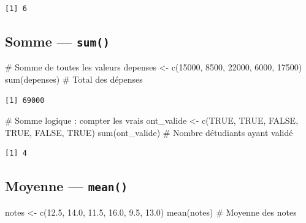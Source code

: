 \documentclass[
  french,
  11pt,
  a4paper,
]{article}
\newenvironment{Shaded}{}{}
\newcommand{\CommentTok}[1]{\textcolor[rgb]{0.42,0.45,0.49}{#1}}
\newcommand{\ConstantTok}[1]{\textcolor[rgb]{0.00,0.36,0.77}{#1}}
\newcommand{\DecValTok}[1]{\textcolor[rgb]{0.00,0.36,0.77}{#1}}
\newcommand{\FloatTok}[1]{\textcolor[rgb]{0.00,0.36,0.77}{#1}}
\newcommand{\FunctionTok}[1]{\textcolor[rgb]{0.44,0.26,0.76}{#1}}
\newcommand{\NormalTok}[1]{\textcolor[rgb]{0.14,0.16,0.18}{#1}}
\newcommand{\OtherTok}[1]{\textcolor[rgb]{0.44,0.26,0.76}{#1}}
\begin{document}
\begin{verbatim}
[1] 6
\end{verbatim}

\subsection{\texorpdfstring{Somme ---
\texttt{sum()}}{Somme --- sum()}}\label{somme-sum}

\begin{Shaded}
\begin{Highlighting}[]
\CommentTok{\# Somme de toutes les valeurs}
\NormalTok{depenses }\OtherTok{\textless{}{-}} \FunctionTok{c}\NormalTok{(}\DecValTok{15000}\NormalTok{, }\DecValTok{8500}\NormalTok{, }\DecValTok{22000}\NormalTok{, }\DecValTok{6000}\NormalTok{, }\DecValTok{17500}\NormalTok{)}
\FunctionTok{sum}\NormalTok{(depenses)  }\CommentTok{\# Total des dépenses}
\end{Highlighting}
\end{Shaded}

\begin{verbatim}
[1] 69000
\end{verbatim}

\begin{Shaded}
\begin{Highlighting}[]
\CommentTok{\# Somme logique : compter les vrais}
\NormalTok{ont\_valide }\OtherTok{\textless{}{-}} \FunctionTok{c}\NormalTok{(}\ConstantTok{TRUE}\NormalTok{, }\ConstantTok{TRUE}\NormalTok{, }\ConstantTok{FALSE}\NormalTok{, }\ConstantTok{TRUE}\NormalTok{, }\ConstantTok{FALSE}\NormalTok{, }\ConstantTok{TRUE}\NormalTok{)}
\FunctionTok{sum}\NormalTok{(ont\_valide)  }\CommentTok{\# Nombre d\textquotesingle{}étudiants ayant validé}
\end{Highlighting}
\end{Shaded}

\begin{verbatim}
[1] 4
\end{verbatim}

\subsection{\texorpdfstring{Moyenne ---
\texttt{mean()}}{Moyenne --- mean()}}\label{moyenne-mean}

\begin{Shaded}
\begin{Highlighting}[]
\NormalTok{notes }\OtherTok{\textless{}{-}} \FunctionTok{c}\NormalTok{(}\FloatTok{12.5}\NormalTok{, }\FloatTok{14.0}\NormalTok{, }\FloatTok{11.5}\NormalTok{, }\FloatTok{16.0}\NormalTok{, }\FloatTok{9.5}\NormalTok{, }\FloatTok{13.0}\NormalTok{)}
\FunctionTok{mean}\NormalTok{(notes)  }\CommentTok{\# Moyenne des notes}
\end{Highlighting}
\end{Shaded}
\end{document}

